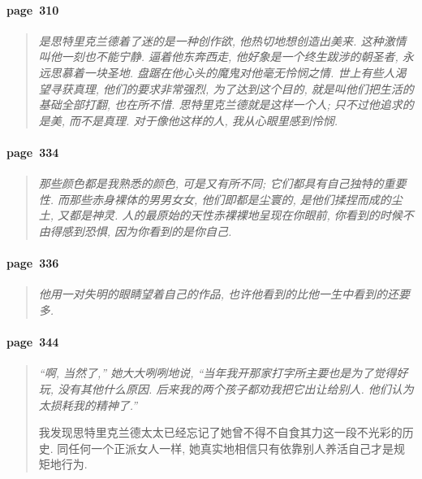 \paragraph*{page~310}
\begin{quotation}
    \itshape
    是思特里克兰德着了迷的是一种创作欲, 他热切地想创造出美来. 这种激情叫他一刻也不能宁静. 逼着他东奔西走, 他好象是一个终生跋涉的朝圣者, 永远思慕着一块圣地. 盘踞在他心头的魔鬼对他毫无怜悯之情. 世上有些人渴望寻获真理, 他们的要求非常强烈, 为了达到这个目的, 就是叫他们把生活的基础全部打翻, 也在所不惜. 思特里克兰德就是这样一个人; 只不过他追求的是美, 而不是真理. 对于像他这样的人, 我从心眼里感到怜悯. 
\end{quotation}

\paragraph*{page~334}
\begin{quotation}
    \itshape
    那些颜色都是我熟悉的颜色, 可是又有所不同; 它们都具有自己独特的重要性. 而那些赤身裸体的男男女女, 他们即都是尘寰的, 是他们揉捏而成的尘土, 又都是神灵. 人的最原始的天性赤裸裸地呈现在你眼前, 你看到的时候不由得感到恐惧, 因为你看到的是你自己. 
\end{quotation}

\paragraph*{page~336}
\begin{quotation}
    \itshape
    他用一对失明的眼睛望着自己的作品, 也许他看到的比他一生中看到的还要多.
\end{quotation}

\paragraph*{page~344}
\begin{quotation}
    \itshape
    ``啊, 当然了,'' 她大大咧咧地说, ``当年我开那家打字所主要也是为了觉得好玩, 没有其他什么原因. 后来我的两个孩子都劝我把它出让给别人. 他们认为太损耗我的精神了.''

    我发现思特里克兰德太太已经忘记了她曾不得不自食其力这一段不光彩的历史. 同任何一个正派女人一样, 她真实地相信只有依靠别人养活自己才是规矩地行为. 
\end{quotation}

